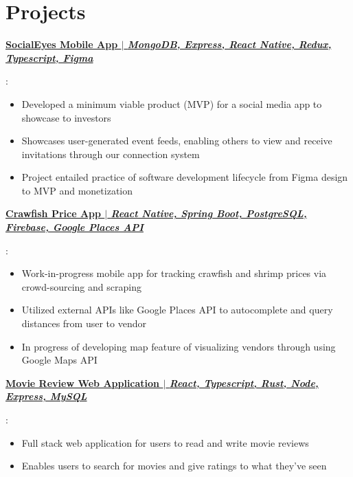 \documentclass[letterpaper,11pt]{article}
\newcommand{\resumeItem}[2]{
  \item\small{
    \textbf{#1}{: #2 \vspace{-2pt}}
  }
}
\newcommand{\resumeSubItem}[2]{\resumeItem{#1}{#2}\vspace{-4pt}}
\newcommand{\resumeSubHeadingListStart}{\begin{itemize}[leftmargin=*]}
\newcommand{\resumeSubHeadingListEnd}{\end{itemize}}
\begin{document}
\section{Projects}
\resumeSubHeadingListStart
    \resumeSubItem{\href{https://github.com/matterwin/csc4330}{SocialEyes Mobile App $\vert$ \textnormal{\textit{MongoDB, Express, React Native, Redux, Typescript, Figma}}}}{%
        \vspace{-7pt}
        \begin{itemize}
                  \item Developed a minimum viable product (MVP) for a social media app to showcase to investors
                  \item Showcases user-generated event feeds, enabling others to view and receive invitations through our connection system
            \item Project entailed practice of software development lifecycle from Figma design to MVP and monetization\vspace{-2pt}
        \end{itemize}
    }
            \resumeSubItem{\href{https://github.com/matterwin/crawfish_shrimp_app}{Crawfish Price App $\vert$ \textnormal{\textit{React Native, Spring Boot, PostgreSQL, Firebase, Google Places API}}}}{%
        \vspace{-7pt}
        \begin{itemize}
            \item Work-in-progress mobile app for tracking crawfish and shrimp prices via crowd-sourcing and scraping \vspace{-2pt}
            \item Utilized external APIs like Google Places API to autocomplete and query distances from user to vendor \vspace{-2pt}
            \item In progress of developing map feature of visualizing vendors through using Google Maps API\vspace{-2pt}
        \end{itemize}
        \resumeSubItem{\href{https://github.com/matterwin/CSC4402-Spring23}{Movie Review Web Application $\vert$ \textnormal{\textit{React, Typescript, Rust, Node, Express, MySQL}}}}{%
        \vspace{-7pt}
        \begin{itemize} %
            \item Full stack web application for users to read and write movie reviews \vspace{-2pt}
            \item Enables users to search for movies and give ratings to what they've seen
        \end{itemize}
    }
    }
\resumeSubHeadingListEnd


\end{document}
